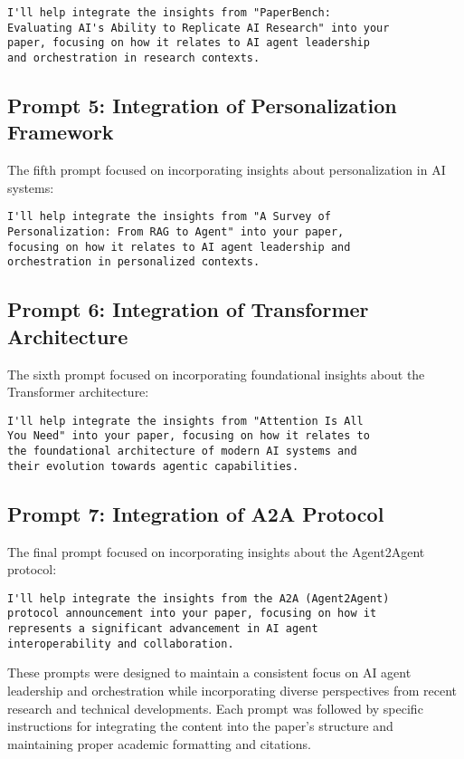 \documentclass[conference]{IEEEtran}
\begin{document}
\begin{lstlisting}
I'll help integrate the insights from "PaperBench: 
Evaluating AI's Ability to Replicate AI Research" into your 
paper, focusing on how it relates to AI agent leadership 
and orchestration in research contexts.
\end{lstlisting}

\subsection{Prompt 5: Integration of Personalization Framework}
The fifth prompt focused on incorporating insights about personalization in AI systems:

\begin{lstlisting}
I'll help integrate the insights from "A Survey of 
Personalization: From RAG to Agent" into your paper, 
focusing on how it relates to AI agent leadership and 
orchestration in personalized contexts.
\end{lstlisting}

\subsection{Prompt 6: Integration of Transformer Architecture}
The sixth prompt focused on incorporating foundational insights about the Transformer architecture:

\begin{lstlisting}
I'll help integrate the insights from "Attention Is All 
You Need" into your paper, focusing on how it relates to 
the foundational architecture of modern AI systems and 
their evolution towards agentic capabilities.
\end{lstlisting}

\subsection{Prompt 7: Integration of A2A Protocol}
The final prompt focused on incorporating insights about the Agent2Agent protocol:

\begin{lstlisting}
I'll help integrate the insights from the A2A (Agent2Agent) 
protocol announcement into your paper, focusing on how it 
represents a significant advancement in AI agent 
interoperability and collaboration.
\end{lstlisting}

These prompts were designed to maintain a consistent focus on AI agent leadership and orchestration while incorporating diverse perspectives from recent research and technical developments. Each prompt was followed by specific instructions for integrating the content into the paper's structure and maintaining proper academic formatting and citations.
\end{document}
